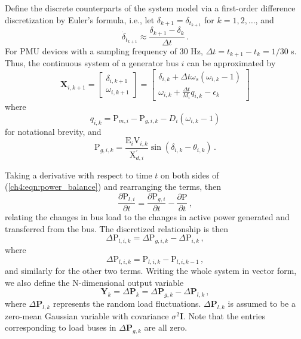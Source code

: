 Define the discrete counterparts of the system model via a first-order difference discretization by Euler's formula, i.e., let $\delta_{k+1} = \delta_{t_{k+1}}$ for $k = 1, 2, \dots$, and 
$$
\dot{\delta}_{t_{k+1}} \approx \frac{\delta_{k+1}-\delta_{k}}{\Delta t} \,.
$$
For PMU devices with a sampling frequency of 30 Hz, $\Delta t = t_{k+1} - t_{k} = 1/30$ s. Thus, the continuous system of a generator bus $i$ can be approximated by
\begin{equation}
\label{ch4:eqn:de_discrete}
\boldsymbol{X}_{i,k+1} = 
\left[
\begin{array}{c}
\delta_{i,k+1} \\
\omega_{i,k+1}
\end{array}
\right] =
\left[
\begin{array}{c}
\delta_{i,k} + \Delta t \omega_s\left(\omega_{i,k}-1\right) \\
\omega_{i,k} + \frac{\Delta t}{M_i}q_{i, k} - \epsilon_{k}\,
\end{array}
\right]  
\end{equation}
where 
$$
q_{i, k} = \text{P}_{m, i}-\text{P}_{g, i,k}-D_i\left(\omega_{i,k}-1\right)
$$
for notational brevity, and 
\begin{equation}
\label{ch4:eqn:p_g_discrete}
\text{P}_{g,i,k} = \frac{\text{E}_i\text{V}_{i, k}}{\text{X}_{d, i}^{'}}\sin (\delta_{i, k} - \theta_{i,k}) \,.
\end{equation}

Taking a derivative with respect to time $t$ on both sides
of (\ref{ch4:eqn:power_balance}) and rearranging the terms, then 
\begin{equation}
    \frac{\partial \text{P}_{l, i}}{\partial t} = \frac{\partial \text{P}_{g, i}}{\partial t} -  \frac{\partial \text{P}}{\partial t} \,,
\end{equation}
relating the changes in bus load to the changes in active power generated and transferred from the bus. The discretized relationship is then
\begin{equation}
\label{ch4:eqn:ae_discrete}
\Delta\text{P}_{l, i, k} = \Delta\text{P}_{g, i, k} -  \Delta\text{P}_{i, k}\,,
\end{equation}
where 
$$
\Delta\text{P}_{l, i, k} = \text{P}_{l, i, k} - \text{P}_{l, i, k-1} \,,
$$
and similarly for the other two terms. Writing the whole system in vector form, we also define the N-dimensional output variable
\begin{equation}
\label{ch4:eqn:ae_discrete}
\boldsymbol{Y}_{k} = \Delta\textbf{P}_{k} =
\Delta\textbf{P}_{g, k}  - \Delta\textbf{P}_{l, k}\,,
\end{equation}
where $\Delta\textbf{P}_{l, k}$ represents the random load fluctuations. $\Delta\textbf{P}_{l, k}$ is assumed to be a zero-mean Gaussian variable with covariance $\sigma^2\mathbf{I}$. Note that the entries corresponding to load buses in $\Delta\textbf{P}_{g, k}$ are all zero. 

